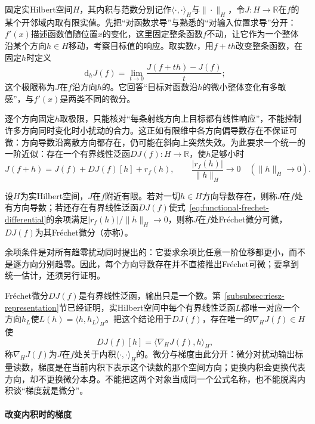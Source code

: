 固定实Hilbert空间$H$，其内积与范数分别记作$\langle\cdot,\cdot\rangle_H$与$\|\cdot\|_H$，令$J:H\to\mathbb R$在$f$的某个开邻域内取有限实值。先把“对函数求导”与熟悉的“对输入位置求导”分开：$f'(x)$描述函数值随位置$x$的变化，这里固定整条函数$f$不动，让它作为一个整体沿某个方向$h\in H$移动，考察目标值的响应。取实数$t$，用$f+th$改变整条函数，在固定$h$时定义
\[
  \mathrm d_hJ(f)
  =\lim_{t\to0}\frac{J(f+th)-J(f)}{t};
\]
这个极限称为$J$在$f$沿方向$h$的。它回答“目标对函数沿$h$的微小整体变化有多敏感”，与$f'(x)$是两类不同的微分。

逐个方向固定$h$取极限，只能核对“每条射线方向上目标都有线性响应”，不能控制许多方向同时变化时小扰动的合力。这正如有限维中各方向偏导数存在不保证可微：方向导数沿离散方向都存在，仍可能在斜向上突然失效。为此要求一个统一的一阶近似：存在一个有界线性泛函$DJ(f):H\to\mathbb R$，使$h$足够小时
\begin{equation}
  J(f+h)=J(f)+DJ(f)[h]+r_f(h),\qquad
  \frac{|r_f(h)|}{\|h\|_H}\to0\quad(\|h\|_H\to0).
  \label{eq:functional-frechet-differential}
\end{equation}
\begin{definition}[方向导数与Fréchet微分]\label{def:functional-frechet}
设$H$为实Hilbert空间，$J$在$f$附近有限。若对一切$h\in H$方向导数存在，则称$J$在$f$处有方向导数；若还存在有界线性泛函$DJ(f)$使式~\eqref{eq:functional-frechet-differential}的余项满足$|r_f(h)|/\|h\|_H\to0$，则称$J$在$f$处Fréchet微分可微，$DJ(f)$为其Fréchet微分（亦称）。
\end{definition}
余项条件是对所有趋零扰动同时提出的：它要求余项比任意一阶位移都更小，而不是逐方向分别趋零。因此，每个方向导数存在并不直接推出Fréchet可微；要拿到统一估计，还须另行证明。

Fréchet微分$DJ(f)$是有界线性泛函，输出只是一个数。第~\ref{subsubsec:riesz-representation}节已经证明，实Hilbert空间中每个有界线性泛函$L$都唯一对应一个方向$h_L$使$L(h)=\langle h,h_L\rangle_H$。把这个结论用于$DJ(f)$，存在唯一的$\nabla_HJ(f)\in H$使
\[
  DJ(f)[h]=\langle\nabla_HJ(f),h\rangle_H,
\]
称$\nabla_HJ(f)$为$J$在$f$处关于内积$\langle\cdot,\cdot\rangle_H$的。微分与梯度由此分开：微分对扰动输出标量读数，梯度是在当前内积下表示这个读数的那个空间方向；更换内积会更换代表方向，却不更换微分本身。不能把这两个对象当成同一个公式名称，也不能脱离内积谈“梯度就是微分”。

\paragraph{改变内积时的梯度}

